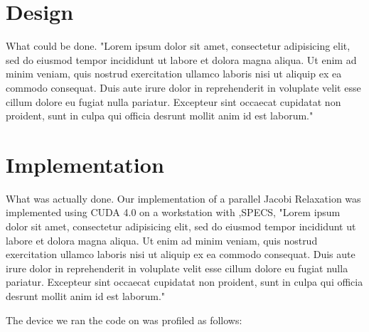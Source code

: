 \documentclass[11pt, twocolumn]{article}
\begin{document}
\section{Design}
What could be done.
"Lorem ipsum dolor sit amet, consectetur adipisicing elit, sed do eiusmod tempor incididunt ut labore et dolora magna aliqua.  Ut enim ad minim veniam, quis nostrud exercitation ullamco laboris nisi ut aliquip ex ea commodo consequat.  Duis aute irure dolor in reprehenderit in voluplate velit esse cillum dolore eu fugiat nulla pariatur.  Excepteur sint occaecat cupidatat non proident, sunt in culpa qui officia desrunt mollit anim id est laborum."

\section{Implementation}
What was actually done.
Our implementation of a parallel Jacobi Relaxation was implemented using CUDA 4.0 on a workstation with ,SPECS,
"Lorem ipsum dolor sit amet, consectetur adipisicing elit, sed do eiusmod tempor incididunt ut labore et dolora magna aliqua.  Ut enim ad minim veniam, quis nostrud exercitation ullamco laboris nisi ut aliquip ex ea commodo consequat.  Duis aute irure dolor in reprehenderit in voluplate velit esse cillum dolore eu fugiat nulla pariatur.  Excepteur sint occaecat cupidatat non proident, sunt in culpa qui officia desrunt mollit anim id est laborum."

The device we ran the code on was profiled as follows:
\end{document}
